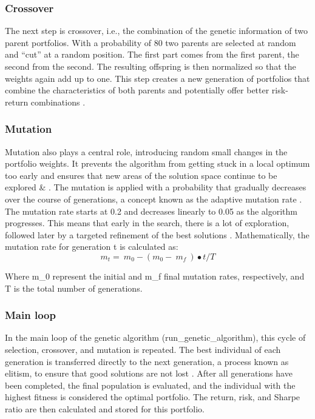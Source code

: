 \documentclass{agasthesis}
\begin{document}
\subsubsection{Crossover}
The next step is crossover, i.e., the combination of the genetic information of two parent portfolios. With a probability of 80%
two parents are selected at random and “cut” at a random position. The first part comes from the first parent, the second from the second. 
The resulting offspring is then normalized so that the weights again add up to one. This step creates a new generation of portfolios that combine 
the characteristics of both parents and potentially offer better risk-return combinations \cite[p. 8-9]{melanie_introduction_1999}.
\subsubsection{Mutation}
Mutation also plays a central role, introducing random small changes in the portfolio weights. It prevents the algorithm from getting stuck in a local 
optimum too early and ensures that new areas of the solution space continue to be explored \cite[p. 129-130]{melanie_introduction_1999} & \cite[p. 471]{kalayci_review_2017}. 
The mutation is applied with a probability that gradually decreases over the course of generations, a concept known as the adaptive mutation rate \cite[p. 181]{rajakumar_static_2013}. 
The mutation rate starts at 0.2 and decreases linearly to 0.05 as the algorithm progresses. This means that early in the search, there is a lot of exploration, followed later 
by a targeted refinement of the best solutions \cite[p. 181]{rajakumar_static_2013}. Mathematically, the mutation rate for generation t is calculated as:
\[
m_t=\ m_0-(m_0-\ m_f\ )\bullet t/T
\]

Where m_0 represent the initial and m_f final mutation rates, respectively, and T is the total number of generations.
\subsubsection{Main loop}
In the main loop of the genetic algorithm (run_genetic_algorithm), this cycle of selection, crossover, and mutation is repeated. The best individual of each generation is transferred 
directly to the next generation, a process known as elitism, to ensure that good solutions are not lost \cite{deb_fast_2002}. After all generations have been completed, 
the final population is evaluated, and the individual with the highest fitness is considered the optimal portfolio. The return, risk, and Sharpe ratio are then calculated and stored for this portfolio.
\end{document}

